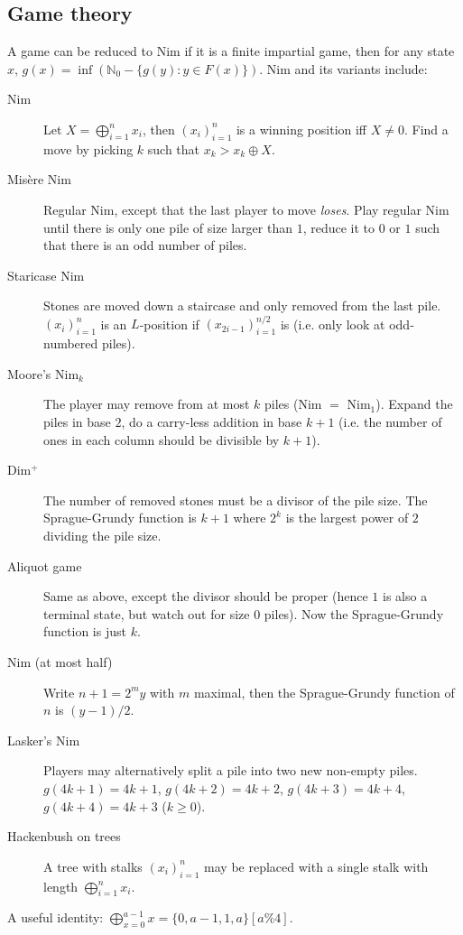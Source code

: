 \documentclass[
	a4paper,
	landscape,
	10pt,
	article
]{article}
\begin{document}
\subsection{Game theory}
A game can be reduced to Nim if it is a finite impartial game, then for any state $x$, $g(x) = \inf (\mathbb{N}_0 - \{g(y) : y \in F(x) \})$. Nim and its variants include:
\begin{description}
	\item[Nim] Let $X = \bigoplus_{i=1}^n x_i$, then $(x_i)_{i=1}^n$ is a winning position iff $X\neq 0$. Find a move by picking $k$ such that $x_k > x_k \oplus X$.
    \item[Misère Nim] Regular Nim, except that the last player to move \textit{loses}. Play regular Nim until there is only one pile of size larger than $1$, reduce it to $0$ or $1$ such that there is an odd number of piles.
    \item[Staricase Nim] Stones are moved down a staircase and only removed from the last pile. $(x_i)_{i=1}^n$ is an $L$-position if $(x_{2i-1})_{i=1}^{n/2}$ is (i.e. only look at odd-numbered piles).
    \item[Moore's Nim$_k$] The player may remove from at most $k$ piles (Nim $=$ Nim$_1$). Expand the piles in base $2$, do a carry-less addition in base $k+1$ (i.e. the number of ones in each column should be divisible by $k+1$).
    \item[Dim$^+$] The number of removed stones must be a divisor of the pile size. The Sprague-Grundy function is $k+1$ where $2^k$ is the largest power of $2$ dividing the pile size.
    \item[Aliquot game] Same as above, except the divisor should be proper (hence $1$ is also a terminal state, but watch out for size $0$ piles). Now the Sprague-Grundy function is just $k$.
    \item[Nim (at most half)] Write $n+1 = 2^my$ with $m$ maximal, then the Sprague-Grundy function of $n$ is $(y - 1) / 2$.
    \item[Lasker's Nim] Players may alternatively split a pile into two new non-empty piles. $g(4k+1) = 4k+1$, $g(4k+2) = 4k+2$, $g(4k+3) = 4k+4$, $g(4k+4) = 4k+3$ ($k\geq 0$).
    \item[Hackenbush on trees] A tree with stalks $(x_i)_{i=1}^n$ may be replaced with a single stalk with length $\bigoplus_{i=1}^n x_i$.
\end{description}
A useful identity: $\bigoplus_{x=0}^{a - 1} x = \{0, a - 1, 1, a\}[a \% 4]$.
\end{document}
